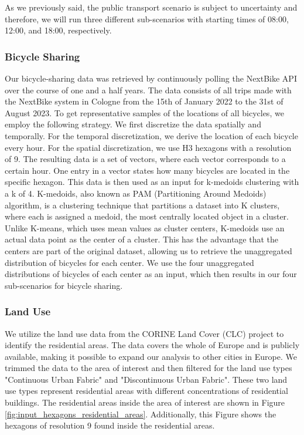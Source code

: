 As we previously said, the public transport scenario is subject to uncertainty and therefore, we will run three different sub-scenarios with starting times of 08:00, 12:00, and 18:00, respectively.


\subsubsection{Bicycle Sharing}
\label{subs:bicycle_sharing}

Our bicycle-sharing data was retrieved by continuously polling the NextBike API over the course of one and a half years.
The data consists of all trips made with the NextBike system in Cologne from the 15th of January 2022 to the 31st of August 2023.
To get representative samples of the locations of all bicycles, we employ the following strategy.
We first discretize the data spatially and temporally.
For the temporal discretization, we derive the location of each bicycle every hour.
For the spatial discretization, we use H3 hexagons with a resolution of 9.
The resulting data is a set of vectors, where each vector corresponds to a certain hour.
One entry in a vector states how many bicycles are located in the specific hexagon.
This data is then used as an input for k-medoids clustering  with a k of 4.
K-medoids, also known as PAM (Partitioning Around Medoids) algorithm, is a clustering technique that partitions a dataset into K clusters, where each is assigned a medoid, the most centrally located object in a cluster. 
Unlike K-means, which uses mean values as cluster centers, K-medoids use an actual data point as the center of a cluster.
This has the advantage that the centers are part of the original dataset, allowing us to retrieve the unaggregated distribution of bicycles for each center.
We use the four unaggregated distributions of bicycles of each center as an input, which then results in our four sub-scenarios for bicycle sharing.


\subsubsection{Land Use}
\label{subs:land_use}

We utilize the land use data from the CORINE Land Cover (CLC) project  to identify the residential areas.
The data covers the whole of Europe and is publicly available, making it possible to expand our analysis to other cities in Europe.
We trimmed the data to the area of interest and then filtered for the land use types "Continuous Urban Fabric" and "Discontinuous Urban Fabric".
These two land use types represent residential areas with different concentrations of residential buildings.
The residential areas inside the area of interest are shown in Figure \ref{fig:input_hexagons_residential_areas}.
Additionally, this Figure shows the hexagons of resolution 9 found inside the residential areas.

